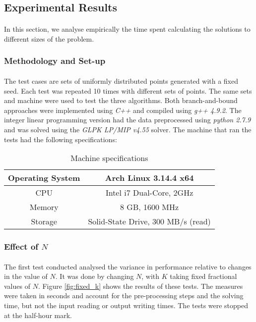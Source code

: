 \subsection{Experimental Results}
\paragraph{}
In this section, we analyse empirically the time spent calculating the solutions to different sizes of the problem. 
\subsubsection*{Methodology and Set-up}
\paragraph{}
The test cases are sets of uniformly distributed points generated with a fixed seed. Each test was repeated 10 times with different sets of points. The same sets and machine were used to test the three algorithms.
Both branch-and-bound approaches were implemented using \emph{C++} and compiled using \emph{g++ 4.9.2}. The integer linear programming version had the data preprocessed using \emph{python 2.7.9} and was solved using the \emph{GLPK LP/MIP v4.55} solver. The machine that ran the tests had the following specifications:

\begin{table}[H]
	\begin{center}
		\begin{tabular}{|c|c|}
			\hline
			Operating System  & Arch Linux 3.14.4 x64\\\hline
			CPU & Intel i7 Dual-Core, 2GHz\\\hline
			Memory & 8 GB, 1600 MHz \\\hline
			Storage &  Solid-State Drive, 300 MB/s (read)\\\hline
		\end{tabular}
		\caption{Machine specifications}
	\end{center}
\end{table}

\subsubsection*{Effect of $N$}
\paragraph{}
The first test conducted analysed the variance in performance relative to changes in the value of $N$. It was done by changing $N$, with $K$ taking fixed fractional values of $N$. Figure \ref{fig:fixed_k} shows the results of these tests. The measures were taken in seconds and account for the pre-processing steps and the solving time, but not the input reading or output writing times. The tests were stopped at the half-hour mark. 

\noindent
